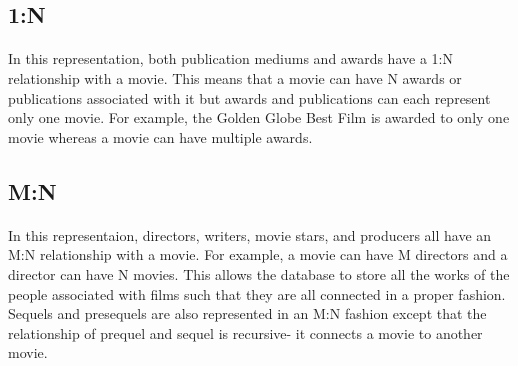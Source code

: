 \documentclass[12pt]{article}
\begin{document}
\subsection{1:N}
\paragraph{}In this representation, both publication mediums and awards have a 1:N relationship with a movie. This means that a movie can have N awards or publications associated with it but awards and publications can each represent only one movie. For example, the Golden Globe Best Film is awarded to only one movie whereas a movie can have multiple awards.
\subsection{M:N}
\paragraph{}In this representaion, directors, writers, movie stars, and producers all have an M:N relationship with a movie. For example, a movie can have M directors and a director can have N movies. This allows the database to store all the works of the people associated with films such that they are all connected in a proper fashion. Sequels and presequels are also represented in an M:N fashion except that the relationship of prequel and sequel is recursive- it connects a movie to another movie.
\end{document}
